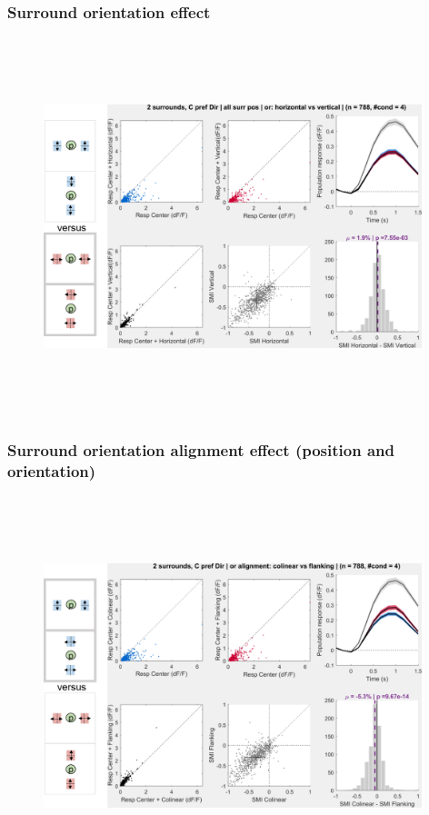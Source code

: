 \subsubsection{Surround orientation effect}

\begin{figure}[H] \centering \includegraphics[width=11cm,height=11cm,keepaspectratio]{Figures/7.Results/population/sel/diagrams/6.png} 
\end{figure}

\subsubsection{Surround orientation alignment effect (position and orientation)}

\begin{figure}[H] \centering \includegraphics[width=11cm,height=11cm,keepaspectratio]{Figures/7.Results/population/sel/diagrams/7.png} 
\end{figure}

